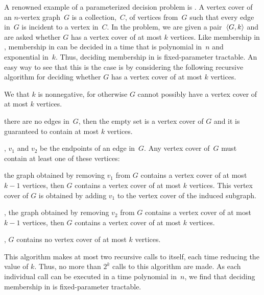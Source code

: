 A renowned example of a parameterized decision problem is .
A vertex cover of an $n$-vertex graph~$G$ is a collection,~$C$, of vertices from~$G$ such that every edge in~$G$ is incident to a vertex in~$C$.
In the  problem, we are given a pair~${\langle G, k\rangle}$ and are asked whether $G$ has a vertex cover of at most $k$ vertices.
Like membership in , membership in  can be decided in a time that is polynomial in~$n$ and exponential in~$k$.
Thus, deciding membership in  is fixed-parameter tractable.
An easy way to see that this is the case is by considering the following recursive algorithm for deciding whether $G$ has a vertex cover of at most $k$ vertices.
\begin{codelisting}
\item
  We  that $k$ is nonnegative, for otherwise $G$ cannot possibly have a vertex cover of at most $k$ vertices.
\item
   there are no edges in~$G$, then the empty set is a vertex cover of $G$ and it is guaranteed to contain at most $k$ vertices.
\item
  ,  $v_1$ and $v_2$ be the endpoints of an edge in~$G$.
  Any vertex cover of~$G$ must contain at least one of these vertices:
  \begin{codelisting}
  \item
     the graph obtained by removing $v_1$ from $G$ contains a vertex cover of at most $k - 1$ vertices, then $G$ contains a vertex cover of at most $k$ vertices.
    This vertex cover of $G$ is obtained by adding $v_1$ to the vertex cover of the induced subgraph.
  \item
    ,  the graph obtained by removing $v_2$ from $G$ contains a vertex cover of at most $k - 1$ vertices, then $G$ contains a vertex cover of at most $k$ vertices.
  \item
    , $G$ contains no vertex cover of at most $k$ vertices.
  \end{codelisting}
\end{codelisting}
This algorithm makes at most two recursive calls to itself, each time reducing the value of $k$.
Thus, no more than $2^k$ calls to this algorithm are made.
As each individual call can be executed in a time polynomial in~$n$, we find that deciding membership in  is fixed-parameter tractable.

